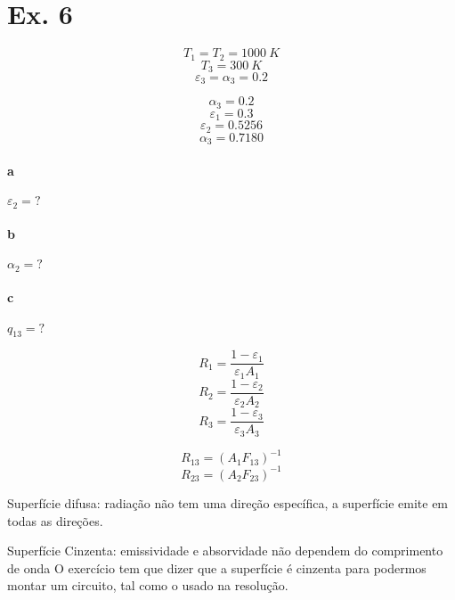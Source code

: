\section{Ex. 6}



\[T_{1} = T_{2} = 1000 \ K\]
\[T_{3} = 300 \ K\]
\[\varepsilon _{3} = \alpha _{3} = 0.2\]

\[\alpha _{3} = 0.2\]
\[\varepsilon _{1} = 0.3\]
\[\varepsilon _{2} = 0.5256\]
\[\alpha _{3} = 0.7180\]



\paragraph*{a} $\varepsilon _{2} = ? $
\paragraph*{b} $\alpha _{2} = ? $
\paragraph*{c} $q_{13} = ? $

\[R_{1} = \frac{1-\varepsilon _{1}}{\varepsilon _{1} A_{1}}\]
\[R_{2} = \frac{1-\varepsilon _{2}}{\varepsilon _{2} A_{2}}\]
\[R_{3} = \frac{1-\varepsilon _{3}}{\varepsilon _{3} A_{3}}\]

\[R_{13} = (A_{1}F_{13})^{-1}\]
\[R_{23} = (A_{2}F_{23})^{-1}\]


Superfície difusa: radiação não tem uma direção específica, a superfície emite em todas as direções.

Superfície Cinzenta: emissividade e absorvidade não dependem do comprimento de onda
O exercício tem que dizer que a superfície é cinzenta para podermos montar um circuito, tal como o usado na resolução.


